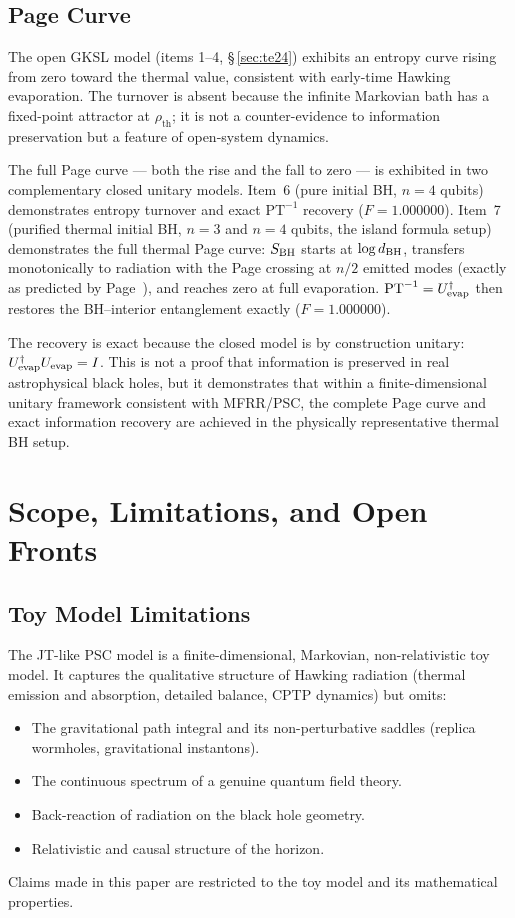 \documentclass[11pt,twocolumn]{article}
\theoremstyle{remark}
\begin{document}
\subsection{Page Curve}

The open GKSL model (items 1--4, \S\,\ref{sec:te24}) exhibits an
entropy curve rising from zero toward the thermal value, consistent
with early-time Hawking evaporation. The turnover is absent because
the infinite Markovian bath has a fixed-point attractor at
$\rho_{\mathrm{th}}$; it is not a counter-evidence to information
preservation but a feature of open-system dynamics.

The full Page curve --- both the rise and the fall to zero --- is
exhibited in two complementary closed unitary models. Item~6
(pure initial BH, $n=4$ qubits) demonstrates entropy turnover and
exact $\mathrm{PT}^{-1}$ recovery ($F=1.000000$). Item~7 (purified
thermal initial BH, $n=3$ and $n=4$ qubits, the island formula setup)
demonstrates the full thermal Page curve: $S_{\rm BH}$ starts at
$\log d_{\rm BH}$, transfers monotonically to radiation with the Page
crossing at $n/2$ emitted modes (exactly as predicted by
Page~\cite{Page1993}), and reaches zero at full evaporation.
$\mathrm{PT}^{-1} = U_{\rm evap}^\dagger$ then restores the BH--interior
entanglement exactly ($F=1.000000$).

The recovery is exact because the closed model is by construction
unitary: $U_{\rm evap}^\dagger U_{\rm evap} = I$. This is not a
proof that information is preserved in real astrophysical black holes,
but it demonstrates that within a finite-dimensional unitary framework
consistent with MFRR/PSC, the complete Page curve and exact information
recovery are achieved in the physically representative thermal BH setup.

\section{Scope, Limitations, and Open Fronts}
\label{sec:scope}

\subsection{Toy Model Limitations}

The JT-like PSC model is a finite-dimensional, Markovian, non-relativistic
toy model. It captures the qualitative structure of Hawking radiation
(thermal emission and absorption, detailed balance, CPTP dynamics) but
omits:
\begin{itemize}
\item The gravitational path integral and its non-perturbative saddles
  (replica wormholes, gravitational instantons).
\item The continuous spectrum of a genuine quantum field theory.
\item Back-reaction of radiation on the black hole geometry.
\item Relativistic and causal structure of the horizon.
\end{itemize}
Claims made in this paper are restricted to the toy model and its
mathematical properties.
\end{document}
